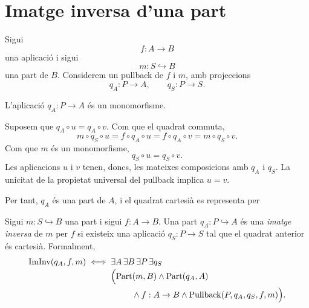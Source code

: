 \section{Imatge inversa d'una part}\label{imatge-inversa}

Sigui
\[
f:A\to B
\]
una aplicació i sigui
\[
m:S\hookrightarrow B
\]
una part de \(B\). Considerem un pullback de \(f\) i \(m\), amb projeccions
\[
q_A:P\to A,
\qquad
q_S:P\to S.
\]

\begin{proposicio}\label{prop:pullback-mono}
L'aplicació \(q_A:P\to A\) és un monomorfisme.
\end{proposicio}

\begin{prova}
Suposem que \(q_A\circ u=q_A\circ v\). Com que el quadrat commuta,
\[
m\circ q_S\circ u
=f\circ q_A\circ u
=f\circ q_A\circ v
=m\circ q_S\circ v.
\]
Com que \(m\) és un monomorfisme,
\[
q_S\circ u=q_S\circ v.
\]
Les aplicacions \(u\) i \(v\) tenen, doncs, les mateixes composicions amb \(q_A\) i \(q_S\). La unicitat de la propietat universal del pullback implica \(u=v\).
\end{prova}

Per tant, \(q_A\) és una part de \(A\), i el quadrat cartesià es representa per
\begin{center}
\end{center}

\begin{definicio}\label{def:imatge-inversa}
Sigui \(m:S\hookrightarrow B\) una part i sigui \(f:A\to B\). Una part \(q_A:P\hookrightarrow A\) és una \emph{imatge inversa} de \(m\) per \(f\) si existeix una aplicació \(q_S:P\to S\) tal que el quadrat anterior és cartesià. Formalment,
\[
\begin{aligned}
\operatorname{ImInv}(q_A,f,m)
\iff{}&
\exists A\,\exists B\,\exists P\,\exists q_S
\\[-0.2em]
&{}\Bigl(
\operatorname{Part}(m,B)
\land\operatorname{Part}(q_A,A)
\\
&\hspace{2.5em}{}\land f:A\to B
\land\operatorname{Pullback}(P,q_A,q_S,f,m)
\Bigr).
\end{aligned}
\]
\end{definicio}

